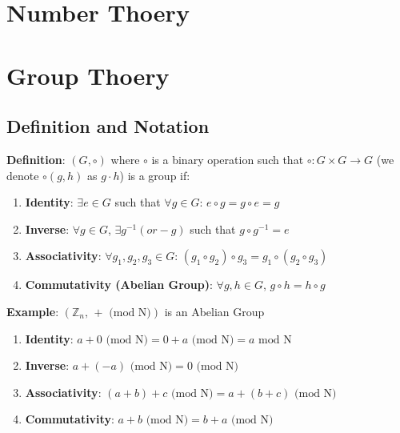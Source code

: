 \documentclass{scribe}
\begin{document}
\maketitle


\section{Number Thoery}


\section{Group Thoery}

\subsection{Definition and Notation}
\textbf{Definition}: $(G,\circ)$ where $\circ$ is a binary operation such that $\circ:G \times G \rightarrow G$ (we denote $\circ(g,h)$ as $g \cdot h$) is a group if:

\begin{enumerate}
    \item \textbf{Identity}: $\exists e \in G$ such that $\forall g \in G$: $e \circ g = g \circ e = g$
    \item \textbf{Inverse}: $\forall g \in G$, $\exists g^{-1} (or -g)$ such that $g \circ g^{-1} = e$
    \item \textbf{Associativity}: $\forall g_1, g_2, g_3 \in G$: $(g_1 \circ g_2) \circ g_3 = g_1 \circ (g_2 \circ g_3)$
    \item \textbf{Commutativity (Abelian Group)}: $\forall g,h \in G$, $g \circ h = h \circ g$
\end{enumerate}

\noindent\textbf{Example}: $(\mathbb{Z}_n \text{, } + \text{ (mod N)})$ is an Abelian Group
\begin{enumerate}
    \item \textbf{Identity}: $ a + 0 \text{ (mod N)} = 0 + a \text{ (mod N)} = a \text{ mod N}$
    \item \textbf{Inverse}: $a+ (-a) \text{ (mod N)} = 0 \text{ (mod N)}$
    \item \textbf{Associativity}: $(a+b)+c \text{ (mod N)} = a+(b+c) \text{ (mod N)} $
    \item \textbf{Commutativity}: $a+b \text{ (mod N)} = b+a \text{ (mod N)}$
\end{enumerate}
\end{document}
